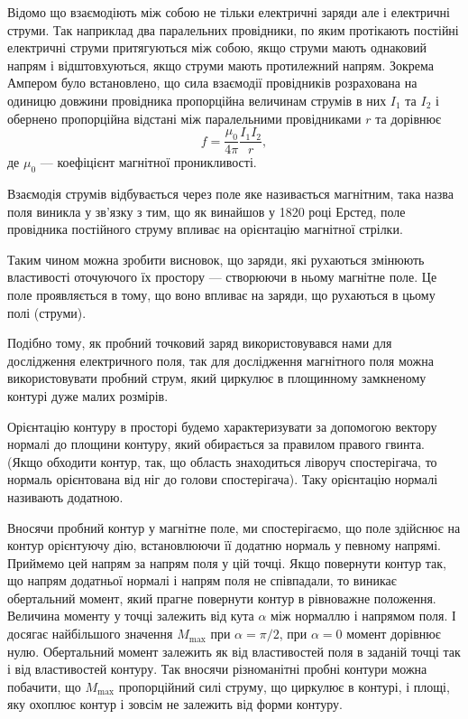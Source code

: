 Відомо що взаємодіють між собою не тільки електричні заряди але і електричні струми. Так наприклад два паралельних провідники, по яким протікають постійні електричні струми притягуються між собою, якщо струми мають однаковий напрям і відштовхуються, якщо струми мають протилежний напрям. Зокрема Ампером було встановлено, що сила взаємодії провідників розрахована на одиницю довжини провідника пропорційна величинам струмів в них $I_1$ та $I_2$ і обернено пропорційна відстані між паралельними провідниками $r$ та дорівнює
\begin{equation}
	f = \frac{\mu_0}{4 \pi} \frac{I_1 I_2}{r},
\end{equation}
де $\mu_0$ --- коефіцієнт магнітної проникливості. \medskip

Взаємодія струмів відбувається через поле яке називається магнітним, така назва поля виникла у зв'язку з тим, що як винайшов у 1820 році Ерстед, поле провідника постійного струму впливає на орієнтацію магнітної стрілки. \medskip

Таким чином можна зробити висновок, що заряди, які рухаються змінюють властивості оточуючого їх простору --- створюючи в ньому магнітне поле. Це поле проявляється в тому, що воно впливає на заряди, що рухаються в цьому полі (струми). \medskip

Подібно тому, як пробний точковий заряд використовувався нами для дослідження електричного поля, так для дослідження магнітного поля можна використовувати пробний струм, який циркулює в площинному замкненому контурі дуже малих розмірів. \medskip

Орієнтацію контуру в просторі будемо характеризувати за допомогою вектору нормалі до площини контуру, який обирається за правилом правого гвинта. (Якщо обходити контур, так, що область знаходиться ліворуч спостерігача, то нормаль орієнтована від ніг до голови спостерігача). Таку орієнтацію нормалі називають додатною. \medskip

Вносячи пробний контур у магнітне поле, ми спостерігаємо, що поле здійснює на контур орієнтуючу дію, встановлюючи її додатню нормаль у певному напрямі. Приймемо цей напрям за напрям поля у цій точці. Якщо повернути контур так, що напрям додатньої нормалі і напрям поля не співпадали, то виникає обертальний момент, який прагне повернути контур в рівноважне положення. Величина моменту у точці залежить від кута $\alpha$ між нормаллю і напрямом поля. І досягає найбільшого значення $M_{\text{max}}$ при $\alpha = \pi / 2$, при $\alpha = 0$ момент дорівнює нулю. Обертальний момент залежить як від властивостей поля в заданій точці так і від властивостей контуру. Так вносячи різноманітні пробні контури можна побачити, що $M_{\text{max}}$ пропорційний силі струму, що циркулює в контурі, і площі, яку охоплює контур і зовсім не залежить від форми контуру. 


